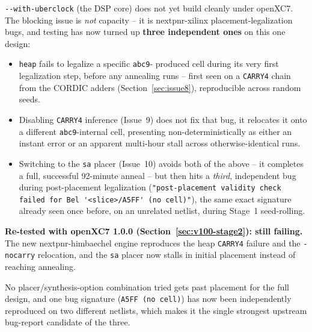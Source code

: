 \documentclass[11pt]{article}
\begin{document}
\lstinline{--with-uberclock} (the DSP core) does not yet build cleanly
under openXC7. The blocking issue is \emph{not} capacity -- it is
nextpnr-xilinx placement-legalization bugs, and testing has now turned up
\textbf{three independent ones} on this one design:
\begin{itemize}[nosep]
  \item \lstinline{heap} fails to legalize a specific \lstinline{abc9}-
  produced cell during its very first legalization step, before any
  annealing runs -- first seen on a \lstinline{CARRY4} chain from the
  CORDIC adders (Section~\ref{sec:issue8}), reproducible across random
  seeds.
  \item Disabling \lstinline{CARRY4} inference (Issue~9) does not fix
  that bug, it relocates it onto a different \lstinline{abc9}-internal
  cell, presenting non-deterministically as either an instant error or
  an apparent multi-hour stall across otherwise-identical runs.
  \item Switching to the \lstinline{sa} placer (Issue~10) avoids both of
  the above -- it completes a full, successful 92-minute anneal -- but
  then hits a \emph{third}, independent bug during post-placement
  legalization (\lstinline{"post-placement validity check failed for Bel '<slice>/A5FF' (no cell)"}), the same exact signature already seen once
  before, on an unrelated netlist, during Stage~1 seed-rolling.
\end{itemize}
\textbf{Re-tested with openXC7 1.0.0 (Section~\ref{sec:v100-stage2}): still
failing.} The new nextpnr-himbaechel engine reproduces the heap
\lstinline{CARRY4} failure and the \lstinline{-nocarry} relocation, and the
\lstinline{sa} placer now stalls in initial placement instead of reaching
annealing.

No placer/synthesis-option combination tried gets past placement for the
full design, and one bug signature (\lstinline{A5FF (no cell)}) has now
been independently reproduced on two different netlists, which makes it
the single strongest upstream bug-report candidate of the three.
\end{document}
